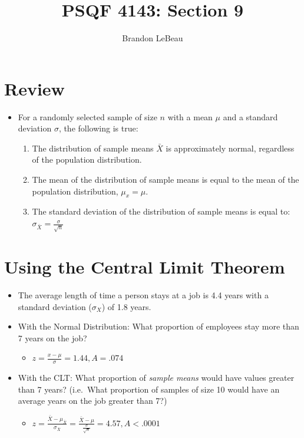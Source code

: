 \documentclass[12pt]{article}
\title{PSQF 4143: Section 9}
\author{Brandon LeBeau}
\date{}
\begin{document}
\maketitle

\section{Review}\label{review}

\begin{itemize}
\itemsep1pt\parskip0pt
\item
  For a randomly selected sample of size \(n\) with a mean \(\mu\) and a
  standard deviation \(\sigma\), the following is true:

  \begin{enumerate}
  \def\labelenumi{\arabic{enumi}.}
  \itemsep1pt\parskip0pt
  \item
    The distribution of sample means \(\bar{X}\) is approximately
    normal, regardless of the population distribution.
  \item
    The mean of the distribution of sample means is equal to the mean of
    the population distribution, \(\mu_{x} = \mu\).
  \item
    The standard deviation of the distribution of sample means is equal
    to: \(\sigma_{\bar{X}} = \frac{\sigma}{\sqrt{n}}\)
  \end{enumerate}
\end{itemize}

\section{Using the Central Limit
Theorem}\label{using-the-central-limit-theorem}

\begin{itemize}
\itemsep1pt\parskip0pt
\item
  The average length of time a person stays at a job is 4.4 years with a
  standard deviation (\(\sigma_{X}\)) of 1.8 years.
\item
  With the Normal Distribution: What proportion of employees stay more
  than 7 years on the job?

  \begin{itemize}
  \itemsep1pt\parskip0pt
  \item
    \(z = \frac{x - \mu}{\sigma} = 1.44, A = .074\)
  \end{itemize}
\item
  With the CLT: What proportion of \emph{sample means} would have values
  greater than 7 years? (i.e.~What proportion of samples of size 10
  would have an average years on the job greater than 7?)

  \begin{itemize}
  \itemsep1pt\parskip0pt
  \item
    \(z = \frac{\bar{X} - \mu_{\bar{X}}}{\sigma_{\bar{X}}} = \frac{\bar{X} - \mu}{\frac{\sigma}{\sqrt{n}}} = 4.57, A < .0001\)
  \end{itemize}
\end{itemize}
\end{document}

